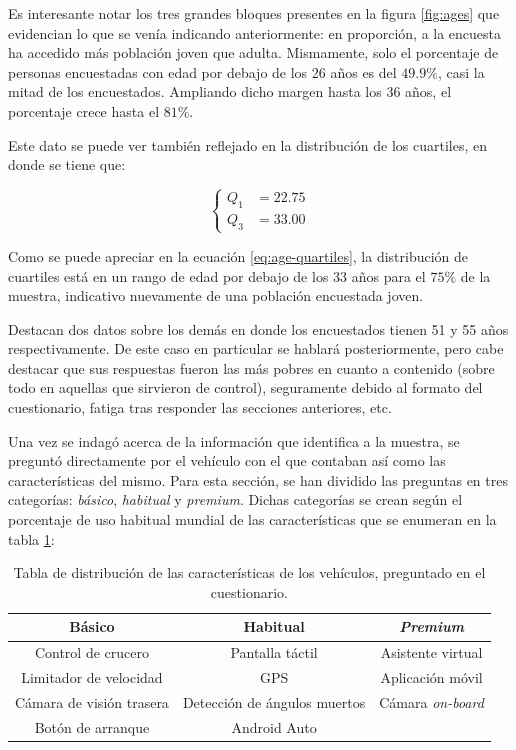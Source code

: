 Es interesante notar los tres grandes bloques presentes en la figura \ref{fig:ages}
que evidencian lo que se venía indicando anteriormente: en proporción, a la encuesta
ha accedido más población joven que adulta. Mismamente, solo el porcentaje de personas
encuestadas con edad por debajo de los 26 años es del $49.9\%$, casi la mitad de
los encuestados. Ampliando dicho margen hasta los 36 años, el porcentaje crece hasta
el $81 \%$.

Este dato se puede ver también reflejado en la distribución de los cuartiles, en donde
se tiene que:

\begin{equation}\label{eq:age-quartiles}
  \left\{
  \begin{aligned}
    Q_1 & = 22.75 \\
    Q_3 & = 33.00
  \end{aligned}
  \right.
\end{equation}

Como se puede apreciar en la ecuación \ref{eq:age-quartiles}, la distribución de
cuartiles está en un rango de edad por debajo de los 33 años para el $75\%$ de la
muestra, indicativo nuevamente de una población encuestada joven.

Destacan dos datos sobre los demás en donde los encuestados tienen 51 y 55 años
respectivamente. De este caso en particular se hablará posteriormente, pero cabe
destacar que sus respuestas fueron las más pobres en cuanto a contenido (sobre todo
en aquellas que sirvieron de control), seguramente debido al formato del
cuestionario, fatiga tras responder las secciones anteriores, etc.

Una vez se indagó acerca de la información que identifica a la muestra, se preguntó
directamente por el vehículo con el que contaban así como las características del
mismo. Para esta sección, se han dividido las preguntas en tres categorías:
\textit{básico}, \textit{habitual} y \textit{premium}. Dichas categorías se crean
según el porcentaje de uso habitual mundial de las características que se
enumeran en la tabla \ref{tab:car-specs}:

\begin{table}[H]
  \centering
  \begin{tabular}{|c|c|c|}
    \hline
    \textbf{Básico}          & \textbf{Habitual}            & \textit{\textbf{Premium}} \\
    \hline\hline
    Control de crucero       & Pantalla táctil              & Asistente virtual         \\
    Limitador de velocidad   & GPS                          & Aplicación móvil          \\
    Cámara de visión trasera & Detección de ángulos muertos & Cámara \textit{on-board}  \\
    Botón de arranque        & Android Auto                 &                           \\
    \hline
  \end{tabular}
  \caption{Tabla de distribución de las características de los vehículos, preguntado en el cuestionario.}
  \label{tab:car-specs}
\end{table}

